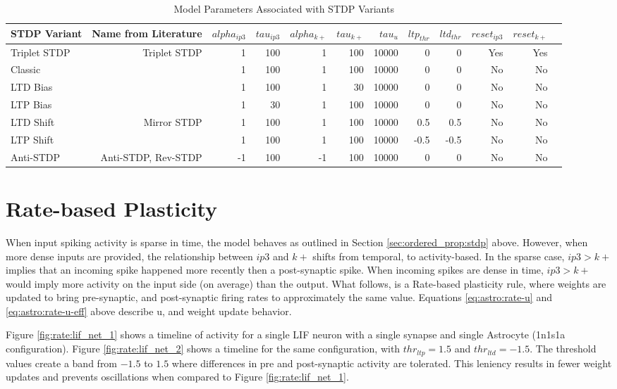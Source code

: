     \begin{table}[!htp]\centering
      \caption{Model Parameters Associated with STDP Variants} \label{table:astro_varient_params}
      \scriptsize
      \begin{tabular}{lrrrrrrrrrrr}\toprule
        STDP Variant &Name from Literature &$alpha_{ip3}$ &$tau_{ip3}$ &$alpha_{k+}$ &$tau_{k+}$ &$tau_u$ &$ltp_{thr}$ &$ltd_{thr}$ &$reset_{ip3}$ &$reset_{k+}$ \\\midrule
        Triplet STDP &Triplet STDP &1 &100 &1 &100 &10000 &0 &0 &Yes &Yes \\
        Classic & &1 &100 &1 &100 &10000 &0 &0 &No &No \\
        LTD Bias & &1 &100 &1 &30 &10000 &0 &0 &No &No \\
        LTP Bias & &1 &30 &1 &100 &10000 &0 &0 &No &No \\
        LTD Shift &Mirror STDP &1 &100 &1 &100 &10000 &0.5 &0.5 &No &No \\
        LTP Shift & &1 &100 &1 &100 &10000 &-0.5 &-0.5 &No &No \\
        Anti-STDP &Anti-STDP, Rev-STDP &-1 &100 &-1 &100 &10000 &0 &0 &No &No \\
        \bottomrule
      \end{tabular}
    \end{table}
    
    \section{Rate-based Plasticity}

    When input spiking activity is sparse in time, the model behaves as outlined
    in Section \ref{sec:ordered_prop:stdp} above. However, when more dense
    inputs are provided, the relationship between $ip3$ and $k+$ shifts from
    temporal, to activity-based. In the sparse case, $ip3 > k+$ implies that an
    incoming spike happened more recently then a post-synaptic spike. When
    incoming spikes are dense in time, $ip3 > k+$ would imply more activity on
    the input side (on average) than the output. What follows, is a Rate-based
    plasticity rule, where weights are updated to bring pre-synaptic, and
    post-synaptic firing rates to approximately the same value. Equations
    \ref{eq:astro:rate-u} and \ref{eq:astro:rate-u-eff} above describe u, and
    weight update behavior.

    Figure \ref{fig:rate:lif_net_1} shows a timeline of activity for a single
    LIF neuron with a single synapse and single Astrocyte (1n1s1a
    configuration). Figure \ref{fig:rate:lif_net_2} shows a timeline for the
    same configuration, with $thr_{ltp}=1.5$ and $thr_{ltd}=-1.5$. The threshold
    values create a band from $-1.5$ to $1.5$ where differences in pre and
    post-synaptic activity are tolerated. This leniency results in fewer weight
    updates and prevents oscillations when compared to Figure
    \ref{fig:rate:lif_net_1}.

